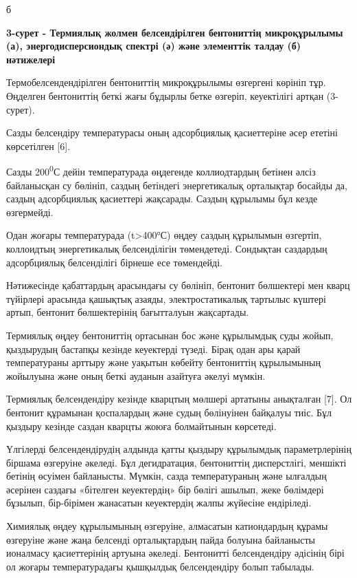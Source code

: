б

{\bfseries 3-сурет - Термиялық жолмен белсендірілген бентониттің
микроқұрылымы (а), энергодисперсиондық спектрі (ә) және элементтік
талдау (б) нәтижелері}

Термобелсендендірілген бентониттің микроқұрылымы өзгергені көрініп тұр.
Өңделген бентониттің беткі жағы бұдырлы бетке өзгеріп, кеуектілігі
артқан (3-сурет).

Сазды белсендіру температурасы оның адсорбциялық қасиеттеріне әсер
ететіні көрсетілген {[}6{]}.

Сазды 200\textsuperscript{0}С дейін температурада өңдегенде
коллиодтардың бетінен әлсіз байланысқан су бөлініп, саздың бетіндегі
энергетикалық орталықтар босайды да, саздың адсорбциялық қасиеттері
жақсарады. Саздың құрылымы бұл кезде өзгермейді.

Одан жоғары температурада (t\textgreater400°С) өңдеу саздың құрылымын
өзгертіп, коллоидтың энергетикалық белсенділігін төмендетеді. Сондықтан
саздардың адсорбциялық белсенділігі бірнеше есе төмендейді.

Нәтижесінде қабаттардың арасындағы су бөлініп, бентонит бөлшектері мен
кварц түйірлері арасында қашықтық азаяды, электростатикалық тартылыс
күштері артып, бентонит бөлшектерінің бағытталуын жақсартады.

Термиялық өңдеу бентониттің ортасынан бос және құрылымдық суды жойып,
қыздырудың бастапқы кезінде кеуектерді түзеді. Бірақ одан ары қарай
температураны арттыру және уақытын көбейту бентониттің құрылымының
жойылуына және оның беткі ауданын азайтуға әкелуі мүмкін.

Термиялық белсендендіру кезінде кварцтың мөлшері артатыны анықталған
{[}7{]}. Ол бентонит құрамынан қоспалардың және судың бөлінуінен
байқалуы тиіс. Бұл қыздыру кезінде саздан кварцты жоюға болмайтынын
көрсетеді.

Үлгілерді белсендендірудің алдында қатты қыздыру құрылымдық
параметрлерінің біршама өзгеруіне әкеледі. Бұл дегидратация, бентониттің
дисперстлігі, меншікті бетінің өсуімен байланысты. Мүмкін, сазда
температураның және ылғалдың әсерінен саздағы «бітелген кеуектердің» бір
бөлігі ашылып, жеке бөлімдері бұзылып, бір-бірімен жанасатын кеуектердің
жалпы жүйесіне ендіріледі.

Химиялық өңдеу құрылымының өзгеруіне, алмасатын катиондардың құрамы
өзгеруіне және жаңа белсенді орталықтардың пайда болуына байланысты
ионалмасу қасиеттерінің артуына әкеледі. Бентонитті белсендендіру
әдісінің бірі ол жоғары температурадағы қышқылдық белсендендіру болып
табылады.

